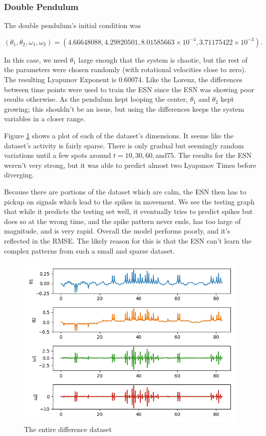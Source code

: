 \documentclass{article}
\begin{document}
\subsubsection{Double Pendulum}

The double pendulum's initial condition was

\begin{equation}
(\theta_1, \theta_2, \omega_1, \omega_2) 
= (4.66648088, 4.29820501,
8.01585663 \times 10^{-4}, 3.71175422 \times 10^{-3}).
\end{equation}

In this case, we need $\theta_1$ large enough that the system is chaotic, but
the rest of the parameters were chosen randomly (with rotational velocities
close to zero). The resulting Lyapunov Exponent is $0.60074$. Like the
Lorenz, the differences between time points were used to train the ESN since
the ESN was showing poor results otherwise. As the pendulum kept looping the
center, $\theta_1$ and $\theta_2$ kept growing; this shouldn't be an issue,
but using the differences keeps the system variables in a closer range.

Figure \ref{fig:doub_pend_diff} shows a plot of each of the dataset's
dimensions. It seems like the dataset's activity is fairly sparse. There is
only gradual but seemingly random variations until a few spots around $t=10,
30, 60, \text{and} 75$. The results for the ESN weren't very strong, but it
was able to predict almost two Lyapunov Times before diverging.

Because there are portions of the dataset which are calm, the ESN then has to
pickup on signals which lead to the spikes in movement. We see the testing
graph that while it predicts the testing set well, it eventually tries to
predict spikes but does so at the wrong time, and the spike pattern never
ends, has too large of magnitude, and is very rapid. Overall the model
performs poorly, and it's reflected in the RMSE. The likely reason for this
is that the ESN can't learn the complex patterns from such a small and sparse
dataset.

\begin{figure}[H]
    \centering
    \includegraphics[width=.5\linewidth]{doc/paper/images/doub_pend/full_differential.png}
    \caption{The entire difference dataset}
    \label{fig:doub_pend_diff}
\end{figure}
\end{document}
